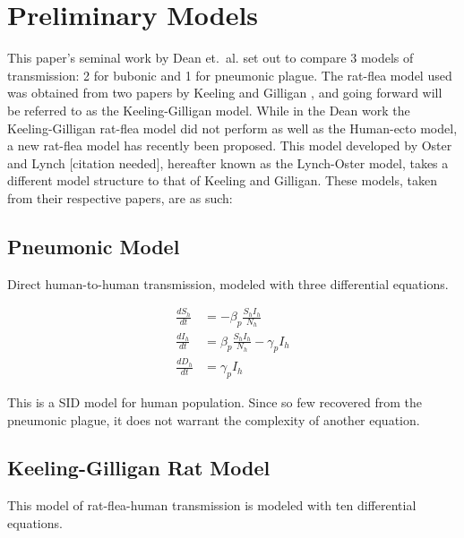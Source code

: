 \documentclass [letterpaper, 12pt] {article}
\begin{document}
%


\pagebreak

\section {Preliminary Models}
This paper's seminal work by Dean et.\ al. \cite{Dean1304} set out to compare 3 models of
transmission: 2 for bubonic and 1 for pneumonic plague. The rat-flea model used was obtained from two papers by Keeling and Gilligan \cite{keeling_gilligan_zoonosis} \cite{keeling2000}, and going forward will be referred to as the Keeling-Gilligan model. While in the Dean work the Keeling-Gilligan rat-flea model did not perform as well as the Human-ecto model, a new rat-flea model has recently been proposed. This model developed by Oster and Lynch [citation needed], hereafter known as the Lynch-Oster model, takes a different model structure to that of Keeling and Gilligan. These models, taken from their respective papers, are as such:

\subsection {Pneumonic Model}
Direct human-to-human transmission, modeled with three differential equations.

\begin{equation}
	\begin{align*}
		\frac{dS_h}{dt} &= - \beta_p \frac{S_h I_h}{N_h} \\
		\frac{dI_h}{dt} &= \beta_p \frac{S_h I_h}{N_h} - \gamma_p I_h \\
		\frac{dD_h}{dt} &= \gamma_p I_h
	\end{align*}
\end{equation}

This is a SID model for human population. Since so few recovered from the pneumonic plague, it does not warrant the complexity of another equation.

\subsection {Keeling-Gilligan Rat Model}
This model of rat-flea-human transmission is modeled with ten differential equations.
\end{document}
